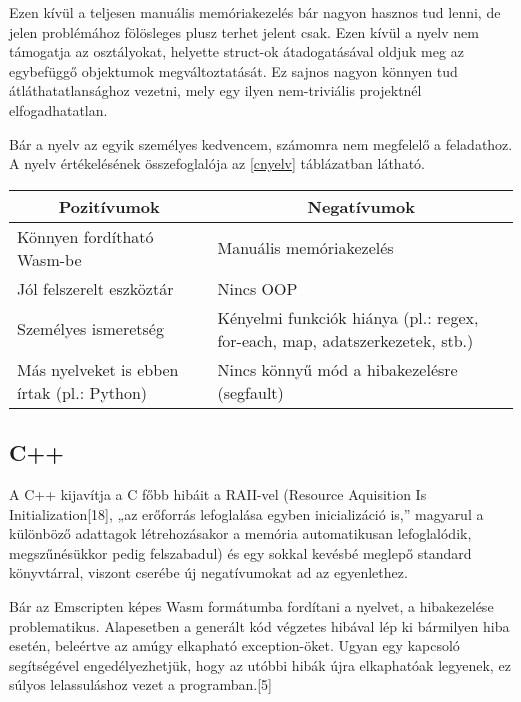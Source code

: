Ezen kívül a teljesen manuális memóriakezelés bár nagyon hasznos tud lenni, de jelen problémához fölösleges plusz terhet jelent csak. Ezen kívül a nyelv nem támogatja az osztályokat, helyette struct-ok átadogatásával oldjuk meg az egybefüggő objektumok megváltoztatását. Ez sajnos nagyon könnyen tud átláthatatlansághoz vezetni, mely egy ilyen nem-triviális projektnél elfogadhatatlan.

Bár a nyelv az egyik személyes kedvencem, számomra nem megfelelő a feladathoz. A nyelv értékelésének összefoglalója az \ref{cnyelv} táblázatban látható.

\begin{center}
  \begin{tabularx}{\textwidth}{X X}
    \hline
    \multicolumn{1}{c}{\bfseries{Pozitívumok}} & \multicolumn{1}{c}{\bfseries{Negatívumok}}                                  \\
    \hline
    Könnyen fordítható Wasm-be                 & Manuális memóriakezelés                                                     \\
    Jól felszerelt eszköztár                   & Nincs OOP                                                                   \\
    Személyes ismeretség                       & Kényelmi funkciók hiánya (pl.: regex, for-each, map, adatszerkezetek, stb.) \\
    Más nyelveket is ebben írtak (pl.: Python) & Nincs könnyű mód a hibakezelésre (segfault)                                 \\
    \hline
  \end{tabularx}
\end{center}

\newpage

\subsection{C++}

A C++ kijavítja a C főbb hibáit a RAII-vel (Resource Aquisition Is Initialization[18], „az erőforrás lefoglalása egyben inicializáció is,” magyarul a különböző adattagok létrehozásakor a memória automatikusan lefoglalódik, megszűnésükkor pedig felszabadul) és egy sokkal kevésbé meglepő standard könyvtárral, viszont cserébe új negatívumokat ad az egyenlethez.

Bár az Emscripten képes Wasm formátumba fordítani a nyelvet, a hibakezelése problematikus. Alapesetben a generált kód végzetes hibával lép ki bármilyen hiba esetén, beleértve az amúgy elkapható exception-öket. Ugyan egy kapcsoló segítségével engedélyezhetjük, hogy az utóbbi hibák újra elkaphatóak legyenek, ez súlyos lelassuláshoz vezet a programban.[5]

